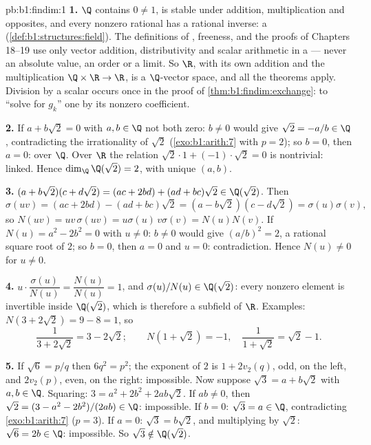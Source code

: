 \begin{solution}{pb:b1:findim:1}
\textbf{1.} $\Q$ contains $0 \neq 1$, is stable under addition,
multiplication and opposites, and every nonzero rational has a
rational inverse: a  (\cref{def:b1:structures:field}). The
definitions of , freeness,  and the proofs of Chapters
18--19 use only vector addition, distributivity and scalar
arithmetic in a  --- never an absolute value, an order or a
limit. So $\R$, with its own addition and the multiplication
$\Q \times \R \to \R$, is a $\Q$-vector space, and all the
theorems apply. Division by a scalar occurs once in the proof of
\cref{thm:b1:findim:exchange}: to ``solve for $g_k$'' one 
by its nonzero coefficient.

\textbf{2.} If $a + b\sqrt2 = 0$ with $a, b \in \Q$ not both
zero: $b \neq 0$ would give $\sqrt2 = -a/b \in \Q$, contradicting
the irrationality of $\sqrt2$ (\cref{exo:b1:arith:7} with $p =
2$); so $b = 0$, then $a = 0$:  over $\Q$. Over $\R$ the
relation $\sqrt2\cdot 1 + (-1)\cdot\sqrt2 = 0$ is nontrivial:
linked. Hence $\dim_\Q \Q(\sqrt2) = 2$, with unique 
$(a, b)$.

\textbf{3.} $(a + b\sqrt2)(c + d\sqrt2) = (ac + 2bd) + (ad +
bc)\sqrt2 \in \Q(\sqrt2)$. Then
\[
\sigma(uv) = (ac + 2bd) - (ad + bc)\sqrt2
= (a - b\sqrt2)(c - d\sqrt2) = \sigma(u)\sigma(v),
\]
so $N(uv) = uv\,\sigma(uv) = u\sigma(u)\,v\sigma(v) = N(u)N(v)$.
If $N(u) = a^2 - 2b^2 = 0$ with $u \neq 0$: $b \neq 0$ would give
$(a/b)^2 = 2$, a rational square root of $2$; so $b = 0$, then $a
= 0$ and $u = 0$: contradiction. Hence $N(u) \neq 0$ for $u \neq
0$.

\textbf{4.} $u \cdot \dfrac{\sigma(u)}{N(u)} = \dfrac{N(u)}{N(u)}
= 1$, and $\sigma(u)/N(u) \in \Q(\sqrt2)$: every nonzero element
is invertible inside $\Q(\sqrt2)$, which is therefore a subfield
of $\R$. Examples: $N(3 + 2\sqrt2) = 9 - 8 = 1$, so
\[
\frac1{3 + 2\sqrt2} = 3 - 2\sqrt2 ;
\qquad
N(1 + \sqrt2) = -1, \quad
\frac1{1 + \sqrt2} = \sqrt2 - 1 .
\]

\textbf{5.} If $\sqrt6 = p/q$ then $6q^2 = p^2$; the exponent of
$2$ is $1 + 2v_2(q)$, odd, on the left, and $2v_2(p)$, even, on
the right: impossible. Now suppose $\sqrt3 = a + b\sqrt2$ with
$a, b \in \Q$. Squaring: $3 = a^2 + 2b^2 + 2ab\sqrt2$. If $ab
\neq 0$, then $\sqrt2 = (3 - a^2 - 2b^2)/(2ab) \in \Q$:
impossible. If $b = 0$: $\sqrt3 = a \in \Q$, contradicting
\cref{exo:b1:arith:7} ($p = 3$). If $a = 0$: $\sqrt3 = b\sqrt2$,
and multiplying by $\sqrt2$: $\sqrt6 = 2b \in \Q$: impossible.
So $\sqrt3 \notin \Q(\sqrt2)$.


\end{solution}
